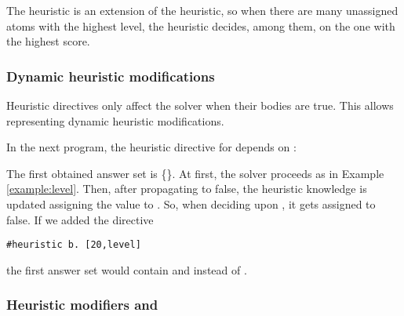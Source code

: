 \begin{note}
The  heuristic is an extension of the  heuristic, 
so when there are many unassigned atoms with the highest level,
the heuristic decides, among them, on the one with the highest  score.
\end{note}

\subsubsection{Dynamic heuristic modifications}

Heuristic directives only affect the solver when their bodies are true.
%
This allows representing dynamic heuristic modifications.
%
\begin{example}
\label{example:dynamic}
In the next program, the heuristic directive for  depends on :

The first obtained answer set is \mbox{\{\}}.
At first, the solver proceeds as in Example \ref{example:level}.
Then, after propagating  to false,
the heuristic knowledge is updated assigning the  value  to .
So, when deciding upon , it gets assigned to false.
If we added the directive 
\begin{lstlisting}[numbers=none]
#heuristic b. [20,level]
\end{lstlisting}
the first answer set would contain  and  instead of .
\end{example}

\subsubsection{Heuristic modifiers  and  }

